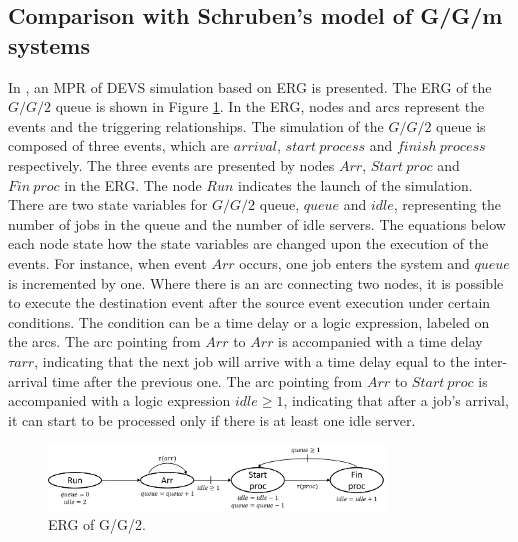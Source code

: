\documentclass[suppldata]{interact}
\theoremstyle{plain}
\theoremstyle{definition}
\theoremstyle{remark}
\begin{document}
\subsection{Comparison with Schruben's model of G/G/m systems}
In \cite{chan2008optimization}, an MPR of DEVS simulation based on ERG is presented. The ERG of the $G/G/2$ queue is shown in Figure \ref{fig:ERG_GG2}. In the ERG, nodes and arcs represent the events and the triggering relationships. The simulation of the $G/G/2$ queue is composed of three events, which are $arrival$, $start\ process$ and $finish\ process$ respectively. The three events are presented by nodes $Arr$, $Start\ proc$ and $Fin\ proc$ in the ERG. The node $Run$ indicates the launch of the simulation. There are two state variables for $G/G/2$ queue, $queue$ and $idle$, representing the number of jobs in the queue and the number of idle servers. The equations below each node state how the state variables are changed upon the execution of the events. For instance, when event $Arr$ occurs, one job enters the system and $queue$ is incremented by one. Where there is an arc connecting two nodes, it is possible to execute the destination event after the source event execution under certain conditions. The condition can be a time delay or a logic expression, labeled on the arcs. The arc pointing from $Arr$ to $Arr$ is accompanied with a time delay $\tau{arr}$, indicating that the next job will arrive with a time delay equal to the inter-arrival time after the previous one. The arc pointing from $Arr$ to $Start\ proc$ is accompanied with a logic expression $idle\ge 1$, indicating that after a job's arrival, it can start to be processed only if there is at least one idle server.

\begin{figure}[h]
	\centering
	\includegraphics[width=0.8\textwidth]{Figures/GG2-ERG.png}
	\caption{ERG of G/G/2.}
	\label{fig:ERG_GG2}
\end{figure}
\end{document}

